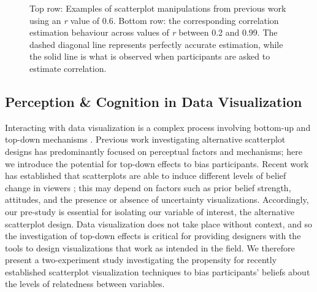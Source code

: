 \documentclass[sigconf]{acmart}
\begin{document}
\begin{figure}


\caption{\label{fig-previous-manipulations}Top row: Examples of
scatterplot manipulations from previous work using an \textit{r} value
of 0.6. Bottom row: the corresponding correlation estimation behaviour
across values of \textit{r} between 0.2 and 0.99. The dashed diagonal
line represents perfectly accurate estimation, while the solid line is
what is observed when participants are asked to estimate correlation.}

\end{figure}%

\subsection{Perception \& Cognition in Data
Visualization}\label{sec-perception-cognition}

Interacting with data visualization is a complex process involving
bottom-up and top-down mechanisms
\citep{shah_2011, franconeri_2021, xiong_2022}. Previous work
investigating alternative scatterplot designs has predominantly focused
on perceptual factors and mechanisms; here we introduce the potential
for top-down effects to bias participants. Recent work has established
that scatterplots are able to induce different levels of belief change
in viewers \citep{karduni_2020, markant_2023}; this may depend on
factors such as prior belief strength, attitudes, and the presence or
absence of uncertainty visualizations. Accordingly, our pre-study is
essential for isolating our variable of interest, the alternative
scatterplot design. Data visualization does not take place without
context, and so the investigation of top-down effects is critical for
providing designers with the tools to design visualizations that work as
intended in the field. We therefore present a two-experiment study
investigating the propensity for recently established scatterplot
visualization techniques to bias participants' beliefs about the levels
of relatedness between variables.
\end{document}

